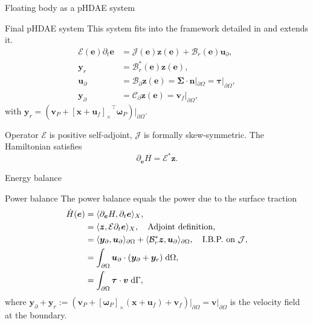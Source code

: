 \documentclass[aspectratio=169]{ISAE-Beamer}
\newcommand{\crmat}[1]{\ensuremath{[#1]_{\times}}}
\begin{document}
\begin{frame}{Floating body as a pHDAE system}
\begin{exampleblock}{Final pHDAE system}
This system fits into the framework detailed in  and extends it.
\begin{equation*}
\begin{aligned}
{\mathcal{E}}(\bm{e}) \partial_t \bm{e} &= {\mathcal{J}}(\bm{e}) \bm{z}(\bm{e}) + {\mathcal{B}}_r(\bm{e}) \bm{u}_\partial, \\
\bm{y}_r &= {\mathcal{B}}_r^*(\bm{e}) \bm{z}(\bm{e}), \\
\bm{u}_\partial &= {\mathcal{B}}_{\partial} \bm{z}(\bm{e}) =  \bm\Sigma \cdot \bm{n}|_{\partial \Omega} = \bm\tau|_{\partial \Omega}, \\
\bm{y}_\partial &= {\mathcal{C}}_{\partial} \bm{z}(\bm{e}) = \bm{v}_f|_{\partial \Omega},
\end{aligned}
\end{equation*}
with $\bm{y}_r = (\bm{v}_P + \crmat{\bm{x}+\bm{u}_f}^\top \bm{\omega}_P)\vert_{\partial\Omega}$.
\end{exampleblock}
Operator $\mathcal{E}$ is positive self-adjoint, $\mathcal{J}$ is formally skew-symmetric.
The Hamiltonian  satisfies 
\begin{equation*}
\partial_{\bm{e}} H = \bm{\mathcal{E}}^* \bm{z}.
\end{equation*}
\end{frame}

\begin{frame}{Energy balance}

\begin{exampleblock}{Power balance}
	The power balance equals the power due to the surface traction
	\begin{equation*}
	\setlength{\abovedisplayskip}{5pt}
	\setlength{\belowdisplayskip}{5pt}
	\begin{aligned}
	\dot{H}(\bm{e}) &= \langle \partial_{\bm{e}} H, \partial_t {\bm{e}} \rangle_{X},\\
	&= \langle \bm{z}, \mathcal{E} \partial_t {\bm{e}} \rangle_{{X}}, \quad \text{Adjoint definition},  \\
	&= \langle \bm{y}_\partial,  \bm{u}_\partial \rangle_{\partial\Omega} + \langle \mathcal{B}_r^* \bm{z}, \bm{u}_\partial \rangle_{\partial\Omega}, \quad \text{I.B.P. on } \mathcal{J}, \\
	&=  \int_{\partial \Omega} \bm{u}_\partial \cdot (\bm{y}_\partial + \bm{y}_r)  \d{\Omega}, \\
	&= \int_{\partial \Omega} \bm\tau \cdot \bm{v} \d\Gamma,  \\
	\end{aligned}
	\end{equation*}
	where $\bm{y}_\partial + \bm{y}_r := (\bm{v}_P + \crmat{\bm{\omega}_P} (\bm{x}+\bm{u}_f) + {\bm{v}}_f)\vert_{\partial\Omega} = \bm{v}\vert_{\partial\Omega}$ is the velocity field at the boundary.
\end{exampleblock}

\end{frame}
\end{document}
